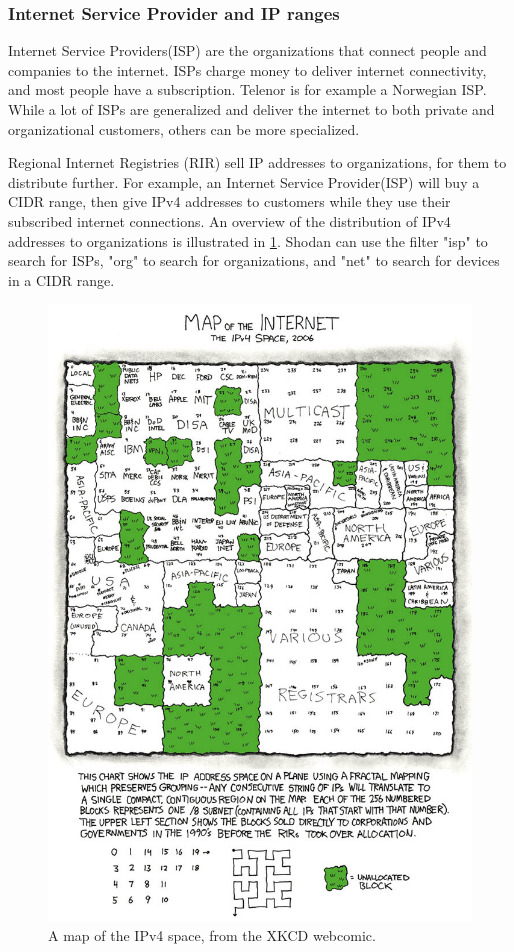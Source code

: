 \subsubsection{Internet Service Provider and IP ranges} \label{sec:isp_method}
Internet Service Providers(ISP) are the organizations that connect people and companies to the internet. ISPs charge money to deliver internet connectivity, and most people have a subscription. Telenor is for example a Norwegian ISP. While a lot of ISPs are generalized and deliver the internet to both private and organizational customers, others can be more specialized. 

Regional Internet Registries (RIR) sell IP addresses to organizations, for them to distribute further. For example, an Internet Service Provider(ISP) will buy a CIDR range, then give IPv4 addresses to customers while they use their subscribed internet connections. An overview of the distribution of IPv4 addresses to organizations is illustrated in \cref{fig:ipv4_map}. Shodan can use the filter "isp" to search for ISPs, "org" to search for organizations, and "net" to search for devices in a CIDR range. 

\begin{figure} [H]
    \centering
    \includegraphics[scale=4]{Figurer/map_of_the_internet.jpg}
    \caption{A map of the IPv4 space, from the XKCD webcomic. \cite{xkcd} }
    \label{fig:ipv4_map}
\end{figure}

